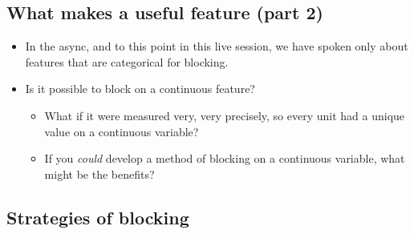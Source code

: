 \documentclass[
]{book}
\providecommand{\tightlist}{%
  \setlength{\itemsep}{0pt}\setlength{\parskip}{0pt}}
\begin{document}
\hypertarget{what-makes-a-useful-feature-part-2}{%
\subsection{What makes a useful feature (part
2)}\label{what-makes-a-useful-feature-part-2}}

\begin{itemize}
\item
  In the async, and to this point in this live session, we have spoken
  only about features that are categorical for blocking.
\item
  Is it possible to block on a continuous feature?

  \begin{itemize}
  \tightlist
  \item
    What if it were measured very, very precisely, so every unit had a
    unique value on a continuous variable?
  \item
    If you \emph{could} develop a method of blocking on a continuous
    variable, what might be the benefits?
  \end{itemize}
\end{itemize}

\hypertarget{strategies-of-blocking}{%
\subsection{Strategies of blocking}\label{strategies-of-blocking}}
\end{document}
